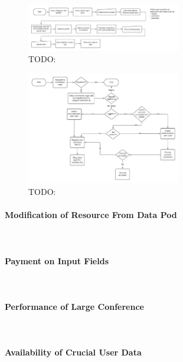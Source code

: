 \begin{figure}
    \centering
    \includegraphics[width=0.6\textwidth]{prototype/graphs/poc-conference_registration_flow-server_side-sideways.jpeg}
    \caption{TODO:}
    \label{fig:poc-conference_registration_flow-server_side-sideways}
\end{figure}

\begin{figure}
    \centering
    \includegraphics[width=0.6\textwidth]{prototype/graphs/poc-conference_registration_flow-sideways.jpeg}
    \caption{TODO:}
    \label{fig:poc-conference_registration_flow-sideways}
\end{figure}




\paragraph{Modification of Resource From Data Pod}\mbox{}\\

\paragraph{Payment on Input Fields}\mbox{}\\

\paragraph{Performance of Large Conference}\mbox{}\\

\paragraph{Availability of Crucial User Data}\mbox{}\\

